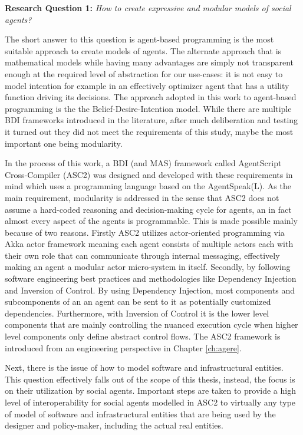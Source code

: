 \textbf{Research Question 1:} \textit{How to create expressive and modular models of social agents?}


The short answer to this question is agent-based programming is the most suitable approach to create models of agents. The alternate approach that is mathematical models while having many advantages are simply not transparent enough at the required level of abstraction for our use-cases: it is not easy to model intention for example in an effectively optimizer agent that has a utility function driving its decisions. The approach adopted in this work to agent-based programming is the the Belief-Desire-Intention model. While there are multiple BDI frameworks introduced in the literature, after much deliberation and testing it turned out they did not meet the requirements of this study, maybe the most important one being modularity.

In the process of this work, a BDI (and MAS) framework called AgentScript Cross-Compiler (ASC2) was designed and developed with these requirements in mind which uses a programming language based on the AgentSpeak(L). As the main requirement, modularity is addressed in the sense that ASC2 does not assume a hard-coded reasoning and decision-making cycle for agents, an in fact almost every aspect of the agents is programmable. This is made possible mainly because of two reasons. Firstly ASC2 utilizes actor-oriented programming via Akka actor framework meaning each agent consists of multiple actors each with their own role that can communicate through internal messaging, effectively making an agent a modular actor micro-system in itself. Secondly, by following software engineering best practices and methodologies like Dependency Injection and Inversion of Control. By using Dependency Injection, most components and subcomponents of an an agent can be sent to it as potentially customized dependencies. Furthermore, with Inversion of Control it is the lower level components that are mainly controlling the nuanced execution cycle when higher level components only define abstract control flows. The ASC2 framework is introduced from an engineering perspective in Chapter \ref{ch:agere}. 

Next, there is the issue of how to model software and infrastructural entities. This question effectively falls out of the scope of this thesis, instead, the focus is on their utilization by social agents. Important steps are taken to provide a high level of interoperability for social agents modelled in ASC2 to virtually any type of model of software and infrastructural entities that are being used by the designer and policy-maker, including the actual real entities.

